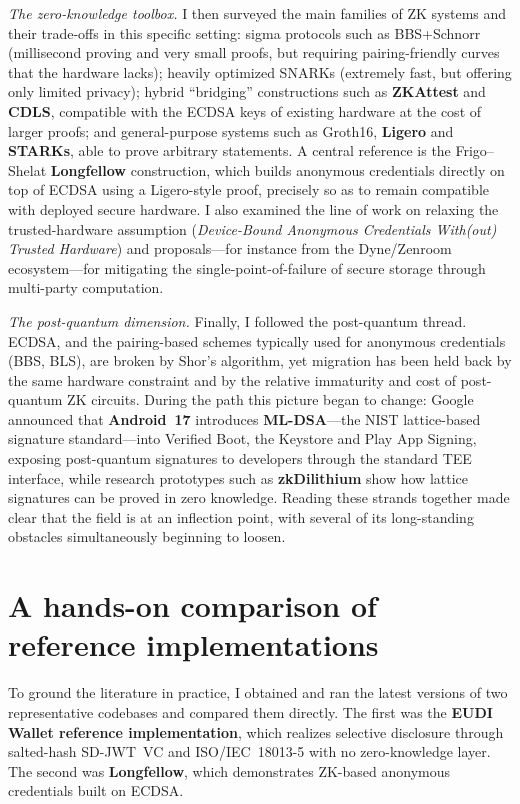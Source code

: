 \documentclass[11pt]{article}
\begin{document}
\emph{The zero-knowledge toolbox.} I then surveyed the main families of ZK systems and their trade-offs in this specific setting: sigma protocols such as BBS+Schnorr (millisecond proving and very small proofs, but requiring pairing-friendly curves that the hardware lacks); heavily optimized SNARKs (extremely fast, but offering only limited privacy); hybrid ``bridging'' constructions such as \textbf{ZKAttest} and \textbf{CDLS}, compatible with the ECDSA keys of existing hardware at the cost of larger proofs; and general-purpose systems such as Groth16, \textbf{Ligero} and \textbf{STARKs}, able to prove arbitrary statements. A central reference is the Frigo--Shelat \textbf{Longfellow} construction, which builds anonymous credentials directly on top of ECDSA using a Ligero-style proof, precisely so as to remain compatible with deployed secure hardware. I also examined the line of work on relaxing the trusted-hardware assumption (\textit{Device-Bound Anonymous Credentials With(out) Trusted Hardware}) and proposals---for instance from the Dyne/Zenroom ecosystem---for mitigating the single-point-of-failure of secure storage through multi-party computation.

\emph{The post-quantum dimension.} Finally, I followed the post-quantum thread. ECDSA, and the pairing-based schemes typically used for anonymous credentials (BBS, BLS), are broken by Shor's algorithm, yet migration has been held back by the same hardware constraint and by the relative immaturity and cost of post-quantum ZK circuits. During the path this picture began to change: Google announced that \textbf{Android~17} introduces \textbf{ML-DSA}---the NIST lattice-based signature standard---into Verified Boot, the Keystore and Play App Signing, exposing post-quantum signatures to developers through the standard TEE interface, while research prototypes such as \textbf{zkDilithium} show how lattice signatures can be proved in zero knowledge. Reading these strands together made clear that the field is at an inflection point, with several of its long-standing obstacles simultaneously beginning to loosen.

\section{A hands-on comparison of reference implementations}
To ground the literature in practice, I obtained and ran the latest versions of two representative codebases and compared them directly. The first was the \textbf{EUDI Wallet reference implementation}, which realizes selective disclosure through salted-hash SD-JWT~VC and ISO/IEC~18013-5 with no zero-knowledge layer. The second was \textbf{Longfellow}, which demonstrates ZK-based anonymous credentials built on ECDSA.
\end{document}
